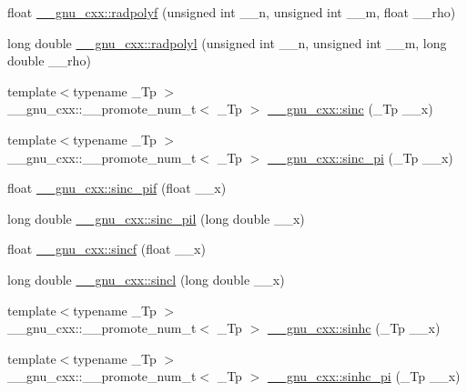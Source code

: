 \begin{DoxyCompactItemize}
float \hyperlink{group__gnu__math__spec__func_ga8a98d7c7c14f1aadff90123a114fa2c9}{\+\_\+\+\_\+gnu\+\_\+cxx\+::radpolyf} (unsigned int \+\_\+\+\_\+n, unsigned int \+\_\+\+\_\+m, float \+\_\+\+\_\+rho)
\item 
long double \hyperlink{group__gnu__math__spec__func_ga377febebd1096400897170bb7a76cd3a}{\+\_\+\+\_\+gnu\+\_\+cxx\+::radpolyl} (unsigned int \+\_\+\+\_\+n, unsigned int \+\_\+\+\_\+m, long double \+\_\+\+\_\+rho)
\item 
{\footnotesize template$<$typename \+\_\+\+Tp $>$ }\\\+\_\+\+\_\+gnu\+\_\+cxx\+::\+\_\+\+\_\+promote\+\_\+num\+\_\+t$<$ \+\_\+\+Tp $>$ \hyperlink{group__gnu__math__spec__func_gab0697cae10f8981fa700ab81c67a7746}{\+\_\+\+\_\+gnu\+\_\+cxx\+::sinc} (\+\_\+\+Tp \+\_\+\+\_\+x)
\item 
{\footnotesize template$<$typename \+\_\+\+Tp $>$ }\\\+\_\+\+\_\+gnu\+\_\+cxx\+::\+\_\+\+\_\+promote\+\_\+num\+\_\+t$<$ \+\_\+\+Tp $>$ \hyperlink{group__gnu__math__spec__func_gacfca76a0549d5c42394e1597f83414da}{\+\_\+\+\_\+gnu\+\_\+cxx\+::sinc\+\_\+pi} (\+\_\+\+Tp \+\_\+\+\_\+x)
\item 
float \hyperlink{group__gnu__math__spec__func_gad92d43d5332c80d1a27c90bfe3f6417e}{\+\_\+\+\_\+gnu\+\_\+cxx\+::sinc\+\_\+pif} (float \+\_\+\+\_\+x)
\item 
long double \hyperlink{group__gnu__math__spec__func_gaad38a6e40b1272391a26dbb32a684b3c}{\+\_\+\+\_\+gnu\+\_\+cxx\+::sinc\+\_\+pil} (long double \+\_\+\+\_\+x)
\item 
float \hyperlink{group__gnu__math__spec__func_gaa87f0734cfe7823c932511ac2f0a876c}{\+\_\+\+\_\+gnu\+\_\+cxx\+::sincf} (float \+\_\+\+\_\+x)
\item 
long double \hyperlink{group__gnu__math__spec__func_ga79a8fd931f5ad4f737e2931e636149ac}{\+\_\+\+\_\+gnu\+\_\+cxx\+::sincl} (long double \+\_\+\+\_\+x)
\item 
{\footnotesize template$<$typename \+\_\+\+Tp $>$ }\\\+\_\+\+\_\+gnu\+\_\+cxx\+::\+\_\+\+\_\+promote\+\_\+num\+\_\+t$<$ \+\_\+\+Tp $>$ \hyperlink{group__gnu__math__spec__func_gad6975a69b8e40a6237b4124b459c6181}{\+\_\+\+\_\+gnu\+\_\+cxx\+::sinhc} (\+\_\+\+Tp \+\_\+\+\_\+x)
\item 
{\footnotesize template$<$typename \+\_\+\+Tp $>$ }\\\+\_\+\+\_\+gnu\+\_\+cxx\+::\+\_\+\+\_\+promote\+\_\+num\+\_\+t$<$ \+\_\+\+Tp $>$ \hyperlink{group__gnu__math__spec__func_ga59ba25b4276fea8c628629420b522b15}{\+\_\+\+\_\+gnu\+\_\+cxx\+::sinhc\+\_\+pi} (\+\_\+\+Tp \+\_\+\+\_\+x)

\end{DoxyCompactItemize}
